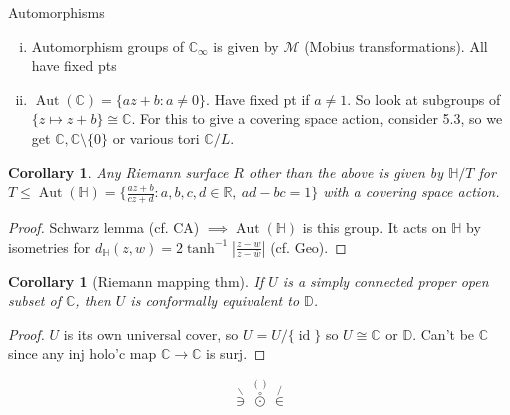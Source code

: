 \documentclass{article}
\theoremstyle{definition}
\theoremstyle{remark}
\theoremstyle{plain}
\newtheorem{crly}[defn]{Corollary}
\newcommand{\RR}{\mathbb{R}}
\newcommand{\CC}{\mathbb{C}}
\newcommand{\id}{\operatorname{id}}
\begin{document}
Automorphisms
\begin{enumerate}[(i)]
    \item Automorphism groups of $\CC_\infty$ is given by $\mathcal M$ (Mobius transformations). All have fixed pts
    \item $\operatorname{Aut}(\CC)=\{az+b:a\neq 0\}$. Have fixed pt if $a\neq 1$. So look at subgroups of $\{z\mapsto z+b\}\cong\CC$. For this to give a covering space action, consider 5.3, so we get $\CC, \CC\setminus\{0\}$ or various tori $\CC/L$.
\end{enumerate}
\begin{crly}
    Any Riemann surface $R$ other than the above is given by $\mathbb H/T$ for $T\le\operatorname{Aut}(\mathbb H)=\{\frac{az+b}{cz+d}:a,b,c,d\in\RR,\ ad-bc=1\}$ with a covering space action.
\end{crly}
\begin{proof}
    Schwarz lemma (cf. CA) $\implies \operatorname{Aut}(\mathbb H)$ is this group. It acts on $\mathbb H$ by isometries for $d_{\mathbb H}(z,w)=2\tanh^{-1}|\frac{z-w}{z-\bar w}|$ (cf. Geo).
\end{proof}
\begin{crly}[Riemann mapping thm]
    If $U$ is a simply connected proper open subset of $\CC$, then $U$ is conformally equivalent to $\mathbb D$.
\end{crly}
\begin{proof}
    $U$ is its own universal cover, so $U=U/\{\id\}$ so $U\cong \CC$ or $\mathbb D$. Can't be $\CC$ since any inj holo'c map $\CC\to\CC$ is surj.
\end{proof}
\[\overset{\backslash}{\ni}\overset{()}{\overset{\circ}{\odot}}\overset{/}{\in}\tag{Owen's Spider}\]
\end{document}
